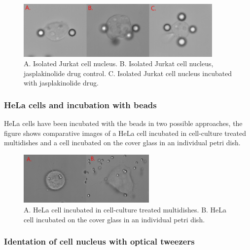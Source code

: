 \documentclass[12pt, a4paper]{article} %
\begin{document}
\setlength{\parskip}{4mm}

\begin{figure}[htbp]
	\centering
	\includegraphics[width=0.9\textwidth]{figures/jurkat_cell_shape.png}
	\caption{A. Isolated Jurkat cell nucleus. B. Isolated Jurkat cell nucleus, jasplakinolide drug control. C. Isolated Jurkat cell nucleus incubated with jasplakinolide drug.}
	\label{fig:jurkat_cells}
\end{figure}

\setlength{\parskip}{0mm}

\subsubsection{HeLa cells and incubation with beads}

HeLa cells have been incubated with the beads in two possible approaches, the figure shows comparative images of a HeLa cell incubated in cell-culture treated multidishes and a cell incubated on the cover glass in an individual petri dish.

\setlength{\parskip}{4mm}

\begin{figure}[htbp]
	\centering
	\includegraphics[width=0.60\textwidth]{figures/hela_cell_shape.png}
	\caption{A. HeLa cell incubated in cell-culture treated multidishes. B. HeLa cell incubated on the cover glass in an individual petri dish.}
	\label{fig:hela_cell_shape} 
\end{figure}

\setlength{\parskip}{0mm}

\subsubsection{Identation of cell nucleus with optical tweezers}
\end{document}
